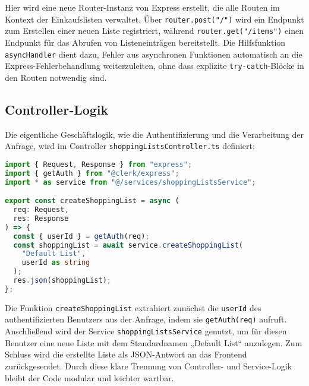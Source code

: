 Hier wird eine neue Router-Instanz von Express erstellt, die alle Routen im Kontext der Einkaufslisten verwaltet. Über \texttt{router.post("/")} wird ein Endpunkt zum Erstellen einer neuen Liste registriert, während \texttt{router.get("/items")} einen Endpunkt für das Abrufen von Listeneinträgen bereitstellt. Die Hilfsfunktion \texttt{asyncHandler} dient dazu, Fehler aus asynchronen Funktionen automatisch an die Express-Fehlerbehandlung weiterzuleiten, ohne dass explizite \texttt{try-catch}-Blöcke in den Routen notwendig sind.

\subsection{Controller‑Logik}
Die eigentliche Geschäftslogik, wie die Authentifizierung und die Verarbeitung der Anfrage, wird im Controller \texttt{shoppingListsController.ts} definiert:

\begin{lstlisting}[language=TypeScript,caption={Erstellen eines Einkaufslisten‑Eintrags im Backend (\texttt{shoppingListsController.ts})}]
import { Request, Response } from "express";
import { getAuth } from "@clerk/express";
import * as service from "@/services/shoppingListsService";

export const createShoppingList = async (
  req: Request,
  res: Response
) => {
  const { userId } = getAuth(req);
  const shoppingList = await service.createShoppingList(
    "Default List",
    userId as string
  );
  res.json(shoppingList);
};
\end{lstlisting}

Die Funktion \texttt{createShoppingList} extrahiert zunächst die \texttt{userId} des authentifizierten Benutzers aus der Anfrage, indem sie \texttt{getAuth(req)} aufruft. Anschließend wird der Service \texttt{shoppingListsService} genutzt, um für diesen Benutzer eine neue Liste mit dem Standardnamen „Default List“ anzulegen. Zum Schluss wird die erstellte Liste als JSON-Antwort an das Frontend zurückgesendet. Durch diese klare Trennung von Controller- und Service-Logik bleibt der Code modular und leichter wartbar.

